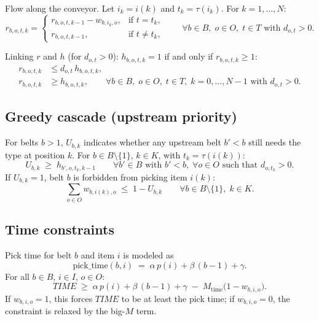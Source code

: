 \documentclass[11pt]{article}
\begin{document}
Flow along the conveyor. Let $i_k = i(k)$ and $t_k = \tau(i_k)$. For $k=1,\ldots,N$:
\begin{equation}
  r_{b,o,t,k} =
  \begin{cases}
    r_{b,o,t,k-1} - w_{b,i_k,o}, & \text{if } t = t_k, \\
    r_{b,o,t,k-1},               & \text{if } t \neq t_k,
  \end{cases}
  \qquad
  \forall b \in B,\; o \in O,\; t \in T \text{ with } d_{o,t}>0.
\end{equation}

Linking $r$ and $h$ (for $d_{o,t}>0$): $h_{b,o,t,k} = 1$ if and only if $r_{b,o,t,k} \ge 1$:
\begin{align}
  r_{b,o,t,k} &\le d_{o,t}\, h_{b,o,t,k}, \\
  r_{b,o,t,k} &\ge h_{b,o,t,k},
  \qquad \forall b \in B,\; o \in O,\; t \in T,\; k = 0,\ldots,N-1 \text{ with } d_{o,t}>0.
\end{align}

\subsection{Greedy cascade (upstream priority)}
For belts $b>1$, $U_{b,k}$ indicates whether any upstream belt $b' < b$ still needs the type at position $k$. For $b \in B \setminus\{1\}$, $k \in K$, with $t_k = \tau(i(k))$:
\begin{equation}
  U_{b,k} \;\ge\; h_{b',o,t_k,k-1}
  \qquad \forall b' \in B \text{ with } b' < b,\; \forall o \in O \text{ such that } d_{o,t_k}>0.
\end{equation}
If $U_{b,k}=1$, belt $b$ is forbidden from picking item $i(k)$:
\begin{equation}
  \sum_{o \in O} w_{b,i(k),o} \;\le\; 1 - U_{b,k}
  \qquad \forall b \in B \setminus\{1\},\; k \in K.
\end{equation}

\subsection{Time constraints}
Pick time for belt $b$ and item $i$ is modeled as
\[
  \text{pick\_time}(b,i)
  \;=\;
  \alpha\, p(i) + \beta\, (b-1) + \gamma.
\]
For all $b \in B$, $i \in I$, $o \in O$:
\begin{equation}
  TIME \;\ge\;
  \alpha\, p(i) + \beta\, (b-1) + \gamma
  \;-\;
  M_{\text{time}} \bigl( 1 - w_{b,i,o} \bigr).
\end{equation}
If $w_{b,i,o}=1$, this forces $TIME$ to be at least the pick time; if $w_{b,i,o}=0$, the constraint is relaxed by the big-$M$ term.
\end{document}
